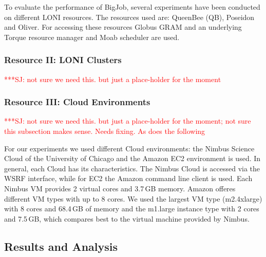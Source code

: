 \documentclass[conference,final]{IEEEtran}
\newcommand{\jhanote}[1]{ {\textcolor{red} { ***SJ: #1 }}}
\newcommand{\jhanote}[1]{}
\begin{document}
To evaluate the performance of BigJob, several experiments have been
conducted on different LONI resources. The resources used are:
QueenBee (QB), Poseidon and Oliver. For accessing these resources
Globus GRAM and an underlying Torque resource manager and Moab
scheduler are used.

\subsubsection*{Resource II: LONI Clusters}
\jhanote{not sure we need this. but just a place-holder for the moment}


\subsubsection*{Resource III: Cloud Environments}
\jhanote{not sure we need this. but just a place-holder for the
  moment; not sure this subsection makes sense. Needs fixing. As does
  the following}

For our experiments we used different Cloud environments: the Nimbus
Science Cloud of the University of Chicago and the Amazon EC2
environment is used. In general, each Cloud has its
characteristics. The Nimbus Cloud is accessed via the WSRF interface,
while for EC2 the Amazon command line client is used. Each Nimbus VM
provides 2 virtual cores and 3.7\,GB memory.  Amazon offeres different
VM types with up to 8 cores. We used the largest VM type (m2.4xlarge)
with 8 cores and 68.4\,GB of memory and the m1.large instance type
with 2 cores and 7.5\,GB, which compares best to the virtual machine
provided by Nimbus.


\subsection{Results and Analysis}
\end{document}
